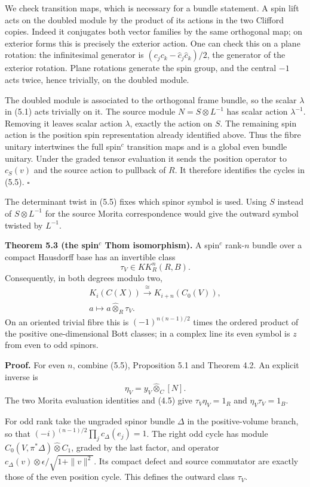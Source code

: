 \documentclass[
  11pt,
]{article}
\begin{document}
We check transition maps, which is necessary for a bundle statement. A
spin lift acts on the doubled module by the product of its actions in
the two Clifford copies. Indeed it conjugates both vector families by
the same orthogonal map; on exterior forms this is precisely the
exterior action. One can check this on a plane rotation: the
infinitesimal generator is \((c_jc_k-\widehat c_j\widehat c_k)/2\), the
generator of the exterior rotation. Plane rotations generate the spin
group, and the central \(-1\) acts twice, hence trivially, on the
doubled module.

The doubled module is associated to the orthogonal frame bundle, so the
scalar \(\lambda\) in (5.1) acts trivially on it. The source module
\(N=S\otimes L^{-1}\) has scalar action \(\lambda^{-1}\). Removing it
leaves scalar action \(\lambda\), exactly the action on \(S\). The
remaining spin action is the position spin representation already
identified above. Thus the fibre unitary intertwines the full
spin\(^{c}\) transition maps and is a global even bundle unitary. Under
the graded tensor evaluation it sends the position operator to
\(c_S(v)\) and the source action to pullback of \(R\). It therefore
identifies the cycles in (5.5). \(\square\)

The determinant twist in (5.5) fixes which spinor symbol is used. Using
\(S\) instead of \(S\otimes L^{-1}\) for the source Morita
correspondence would give the outward symbol twisted by \(L^{-1}\).

\textbf{Theorem 5.3 (the spin\(^{c}\) Thom isomorphism).} A spin\(^{c}\)
rank-\(n\) bundle over a compact Hausdorff base has an invertible class
\[
\tau_V\in KK_R^n(R,B).
\tag{5.6}
\] Consequently, in both degrees modulo two, \[
\begin{gathered}
K_i(C(X))\xrightarrow{\ \cong\ }K_{i+n}(C_0(V)),\\
a\longmapsto a\widehat\otimes_R\tau_V.
\end{gathered}
\tag{5.7}
\] On an oriented trivial fibre this is \((-1)^{n(n-1)/2}\) times the
ordered product of the positive one-dimensional Bott classes; in a
complex line its even symbol is \(z\) from even to odd spinors.

\textbf{Proof.} For even \(n\), combine (5.5), Proposition 5.1 and
Theorem 4.2. An explicit inverse is \[
\eta_V=y_V\widehat\otimes_C[N].
\tag{5.8}
\] The two Morita evaluation identities and (4.5) give
\(\tau_V\eta_V=1_R\) and \(\eta_V\tau_V=1_B\).

For odd rank take the ungraded spinor bundle \(\Delta\) in the
positive-volume branch, so that
\((-i)^{(n-1)/2}\prod_jc_\Delta(e_j)=1\). The right odd cycle has module
\(C_0(V,\pi^*\Delta)\widehat\otimes C_1\), graded by the last factor,
and operator \(c_\Delta(v)\otimes\epsilon/\sqrt{1+\|v\|^2}\). Its
compact defect and source commutator are exactly those of the even
position cycle. This defines the outward class \(\tau_V\).
\end{document}
